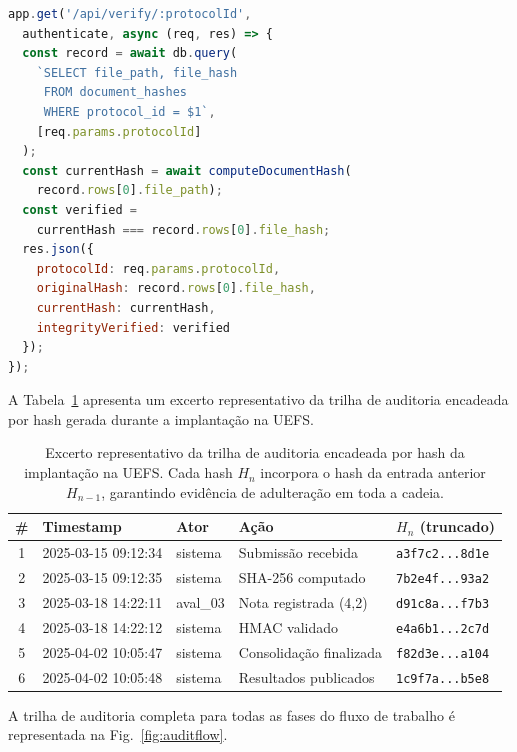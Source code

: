 \documentclass[preprint,12pt,a4paper]{elsarticle}
\begin{document}
\begin{lstlisting}[language=JavaScript, caption={Endpoint de verificação de integridade documental. Compara o hash armazenado com um hash recém-computado para detectar modificação pós-submissão.}, label=lst:verify]
app.get('/api/verify/:protocolId',
  authenticate, async (req, res) => {
  const record = await db.query(
    `SELECT file_path, file_hash
     FROM document_hashes
     WHERE protocol_id = $1`,
    [req.params.protocolId]
  );
  const currentHash = await computeDocumentHash(
    record.rows[0].file_path);
  const verified =
    currentHash === record.rows[0].file_hash;
  res.json({
    protocolId: req.params.protocolId,
    originalHash: record.rows[0].file_hash,
    currentHash: currentHash,
    integrityVerified: verified
  });
});
\end{lstlisting}

A Tabela~\ref{tab:auditsample} apresenta um excerto representativo da trilha de auditoria encadeada por hash gerada durante a implantação na UEFS.

\begin{table}[H]
\centering
\footnotesize
\begin{tabular}{|c|l|l|l|l|}
\hline
\textbf{\#} & \textbf{Timestamp} & \textbf{Ator} & \textbf{Ação} & \textbf{$H_n$ (truncado)} \\
\hline
1 & 2025-03-15 09:12:34 & sistema & Submissão recebida & \texttt{a3f7c2...8d1e} \\
\hline
2 & 2025-03-15 09:12:35 & sistema & SHA-256 computado & \texttt{7b2e4f...93a2} \\
\hline
3 & 2025-03-18 14:22:11 & aval\_03 & Nota registrada (4,2) & \texttt{d91c8a...f7b3} \\
\hline
4 & 2025-03-18 14:22:12 & sistema & HMAC validado & \texttt{e4a6b1...2c7d} \\
\hline
5 & 2025-04-02 10:05:47 & sistema & Consolidação finalizada & \texttt{f82d3e...a104} \\
\hline
6 & 2025-04-02 10:05:48 & sistema & Resultados publicados & \texttt{1c9f7a...b5e8} \\
\hline
\end{tabular}
\caption{Excerto representativo da trilha de auditoria encadeada por hash da implantação na UEFS. Cada hash $H_n$ incorpora o hash da entrada anterior $H_{n-1}$, garantindo evidência de adulteração em toda a cadeia.}
\label{tab:auditsample}
\end{table}

A trilha de auditoria completa para todas as fases do fluxo de trabalho é representada na Fig.~\ref{fig:auditflow}.
\end{document}

